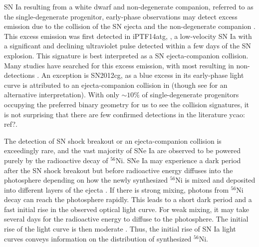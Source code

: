 \documentclass[twocolumn]{aastex61}
\newcommand{\ycao}[1]{{\color{red} ycao: {#1}}}
\begin{document}
SN Ia resulting from a white dwarf and non-degenerate companion, referred to as the single-degenerate progenitor, early-phase observations may detect excess emission due to the collision of the SN ejecta and the non-degenerate companion \citep{1973ApJ...186.1007W,2010ApJ...708.1025K}. This excess emission was first detected in iPTF14atg,  \citep{2015Natur.521..328C}, a low-velocity SN Ia with a significant and declining ultraviolet pulse detected within a
few days of the SN explosion. This signature is best interpreted as a
SN ejecta-companion collision. Many studies have searched for this excess emission, with most resulting in non-detections
\citep{2010ApJ...722.1691H,2011ApJ...741...20B,2012ApJ...744...38F,
  2012ApJ...744L..17B,2015Natur.521..332O,
  2013ApJ...778L..15Z,2015ApJ...799..106G,2016ApJ...826..144S,
  2015ApJS..221...22I}. An exception is SN2012cg, 
  as a blue excess in its early-phase light curve is attributed to an ejecta-companion collision in \citet{2016ApJ...820...92M} (though see \citealt{2016arXiv161007601S} for an alternative interpretation). 
With only $\sim 10\%$ of single-degenerate progenitors occupying the preferred binary geometry for us to see the collision
signatures, it is not surprising that there are few confirmed detections in the literature \ycao{ref?}. 

The detection of SN shock breakout or an ejecta-companion collision is exceedingly rare, and the vast majority of SNe Ia are observed to be 
powered purely by the radioactive decay of $^{56}$Ni. 
SNe Ia may experience a dark period after
the SN shock breakout but before radioactive energy diffuses into
the photosphere depending on how the newly synthesized $^{56}$Ni is mixed and deposited into different layers of the ejecta \citep{2014ApJ...784...85P}. If there is strong
mixing, photons from $^{56}$Ni decay can reach the photosphere rapidly. This leads to a short dark period and a fast initial rise in the observed optical light curve. For weak mixing, it may take several days for
the radioactive energy to diffuse to the photosphere. The initial rise
of the light curve is then moderate \citep{2016ApJ...826...96P}. Thus, the initial rise of SN Ia light curves conveys
information on the distribution of synthesized $^{56}$Ni. 
\end{document}

